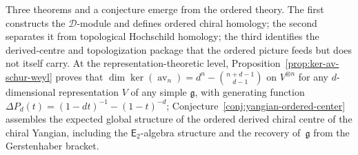 \documentclass[11pt,reqno]{amsart}
\theoremstyle{definition}
\theoremstyle{remark}
\newcommand{\cD}{\mathcal{D}}
\newcommand{\Etwo}{\mathsf{E}_{2}}
\DeclareMathOperator{\av}{av}
\newcommand{\fg}{\mathfrak{g}}
\numberwithin{equation}{section}
\begin{document}
Three theorems and a conjecture emerge from the ordered theory.
The first constructs the $\cD$-module and defines ordered
chiral homology; the second separates it from topological Hochschild
homology; the third identifies the derived-centre and
topologization package that the ordered picture feeds but
does not itself carry.
At the representation-theoretic level,
Proposition~\ref{prop:ker-av-schur-weyl} proves that
$\dim\ker(\av_n) = d^n -
\binom{n+d-1}{d-1}$ on $V^{\otimes n}$ for any
$d$-dimensional representation $V$ of any simple $\fg$,
with generating function
$\Delta P_d(t) = (1-dt)^{-1} - (1-t)^{-d}$;
Conjecture~\ref{conj:yangian-ordered-center} assembles
the expected global structure of the ordered derived
chiral centre of the chiral Yangian, including the
$\Etwo$-algebra structure and the recovery of~$\fg$
from the Gerstenhaber bracket.
\end{document}
